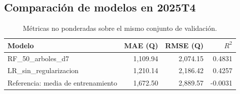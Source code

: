 \subsection{Comparación de modelos en 2025T4}
\begin{table}[htbp]\centering\small
\begin{tabular}{lrrr}\toprule
Modelo & MAE (Q) & RMSE (Q) & $R^2$ \\ \midrule
RF\_50\_arboles\_d7 & 1,109.94 & 2,074.15 & 0.4831 \\
LR\_sin\_regularizacion & 1,210.14 & 2,186.42 & 0.4257 \\
Referencia: media de entrenamiento & 1,672.50 & 2,889.57 & -0.0031 \\
\bottomrule\end{tabular}
\caption{Métricas no ponderadas sobre el mismo conjunto de validación.}
\end{table}

